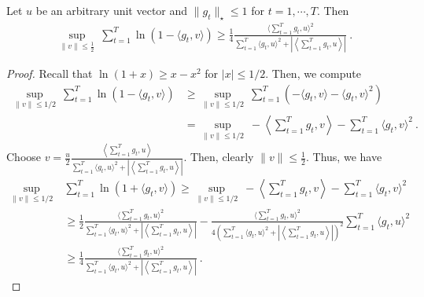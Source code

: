 \documentclass[12pt]{colt2018} %
\begin{document}
\begin{theorem}\label{thm:wealthfixedunit}
Let $u$ be an arbitrary unit vector and $\|g_t\|_\star \leq 1$ for $t=1,\cdots,T$. Then
\begin{align*}
\sup_{\|v\|\le \frac{1}{2}} \ \sum_{t=1}^T \ln(1-\langle g_t,v\rangle)
\ge \frac{1}{4}\frac{\langle \sum_{t=1}^T g_t, u\rangle^2}{\sum_{t=1}^T \langle g_t,u\rangle^2+\left|\left \langle \sum_{t=1}^T g_t,u\right\rangle\right|}~.
\end{align*}
\end{theorem}
\begin{proof}
Recall that $\ln(1+x)\ge x-x^2$ for $|x|\le 1/2$. Then, we compute
\begin{align*}
\sup_{\|v\|\le 1/2} \ \sum_{t=1}^T \ln(1-\langle g_t,v\rangle)
&\ge \sup_{\|v\|\le 1/2} \ \sum_{t=1}^T \left(-\langle g_t,v\rangle - \langle g_t,v\rangle^2\right)\\
&= \sup_{\|v\|\le 1/2} \  -\left\langle \sum_{t=1}^T g_t, v\right\rangle - \sum_{t=1}^T \langle g_t,v\rangle^2~.
\end{align*}
Choose $v = \frac{u}{2}\frac{\left \langle \sum_{t=1}^T g_t,u\right\rangle }{\sum_{t=1}^T \langle g_t,u\rangle^2+\left|\left \langle \sum_{t=1}^T g_t,u\right\rangle\right|}$. Then, clearly $\|v\|\le\frac{1}{2}$. Thus, we have
\begin{align*}
\sup_{\|v\|\le 1/2} \ &\sum_{t=1}^T \ln(1+\langle g_t,v\rangle)
\ge \sup_{\|v\|\le 1/2} \  -\left\langle \sum_{t=1}^T g_t, v\right\rangle - \sum_{t=1}^T \langle g_t,v\rangle^2\\
&\ge \frac{1}{2}\frac{\langle \sum_{t=1}^T g_t, u\rangle^2}{\sum_{t=1}^T \langle g_t,u\rangle^2+\left|\left \langle \sum_{t=1}^T g_t,u\right\rangle\right|} - \frac{ \langle \sum_{t=1}^T g_t,u\rangle^2 }{4\left(\sum_{t=1}^T \langle g_t,u\rangle^2+\left|\left \langle \sum_{t=1}^T g_t,u\right\rangle\right|\right)^2}\sum_{t=1}^T\langle g_t,u\rangle^2\\
&\ge \frac{1}{4}\frac{\langle \sum_{t=1}^T g_t, u\rangle^2}{\sum_{t=1}^T \langle g_t,u\rangle^2+\left|\left \langle \sum_{t=1}^T g_t,u\right\rangle\right|}~.
\end{align*}
\end{proof}
\end{document}
